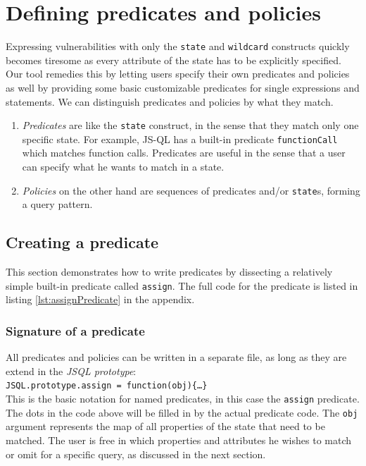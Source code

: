 \section{Defining predicates and policies}
\label{sec:DefiningPolicies}


Expressing vulnerabilities with only the \texttt{state} and \texttt{wildcard} constructs quickly becomes tiresome as every attribute of the state has to be explicitly specified. Our tool remedies this by letting users specify their own predicates and policies as well by providing some basic customizable predicates for single expressions and statements.
We can distinguish predicates and policies by what they match. 
\begin{enumerate}
\item \textit{Predicates} are like the \texttt{state} construct, in the sense that they match only one specific state. For example, JS-QL has a built-in predicate \texttt{functionCall} which matches function calls. Predicates are useful in the sense that a user can specify what he wants to match in a state.
\item \textit{Policies} on the other hand are sequences of predicates and/or \texttt{state}s, forming a query pattern. 
\end{enumerate}

\subsection{Creating a predicate}

This section demonstrates how to write predicates by dissecting a relatively simple built-in predicate called \texttt{assign}. The full code for the predicate is listed in listing \ref{lst:assignPredicate} in the appendix.

\subsubsection*{Signature of a predicate}
All predicates and policies can be written in a separate file, as long as they are extend in the \textit{JSQL prototype}:\\
\texttt{JSQL.prototype.assign = function(obj)\{\ldots \}}\\
This is the basic notation for named predicates, in this case the \texttt{assign} predicate. The dots in the code above will be filled in by the actual predicate code. The \texttt{obj} argument represents the map of all properties of the state that need to be matched. The user is free in which properties and attributes he wishes to match or omit for a specific query, as discussed in the next section.

